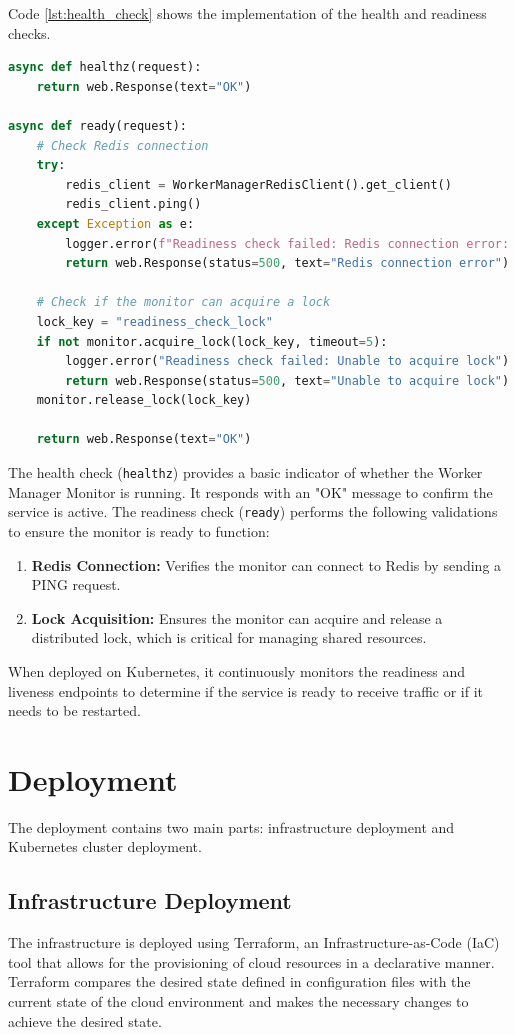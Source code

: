 Code \ref{lst:health_check} shows the implementation of the health and readiness checks.

\begin{lstlisting}[language=python, caption={Worker Manager Monitor Health and Readiness Checks}, label={lst:health_check}]
async def healthz(request):
    return web.Response(text="OK")

async def ready(request):
    # Check Redis connection
    try:
        redis_client = WorkerManagerRedisClient().get_client()
        redis_client.ping()
    except Exception as e:
        logger.error(f"Readiness check failed: Redis connection error: {str(e)}")
        return web.Response(status=500, text="Redis connection error")

    # Check if the monitor can acquire a lock
    lock_key = "readiness_check_lock"
    if not monitor.acquire_lock(lock_key, timeout=5):
        logger.error("Readiness check failed: Unable to acquire lock")
        return web.Response(status=500, text="Unable to acquire lock")
    monitor.release_lock(lock_key)

    return web.Response(text="OK")
\end{lstlisting}

The health check (\texttt{healthz}) provides a basic indicator of whether the Worker Manager Monitor is running. It responds with an "OK" message to confirm the service is active.
The readiness check (\texttt{ready}) performs the following validations to ensure the monitor is ready to function:
\begin{enumerate}
    \item \textbf{Redis Connection:} Verifies the monitor can connect to Redis by sending a PING request.
    \item \textbf{Lock Acquisition:} Ensures the monitor can acquire and release a distributed lock, which is critical for managing shared resources.
\end{enumerate}

When deployed on Kubernetes, it continuously monitors the readiness and liveness endpoints to determine if the service is ready to receive traffic or if it needs to be restarted.

\section{Deployment}
The deployment contains two main parts: infrastructure deployment and Kubernetes cluster deployment.
\subsection{Infrastructure Deployment}
The infrastructure is deployed using Terraform, an Infrastructure-as-Code (IaC) tool that allows for the provisioning of cloud resources in a declarative manner. Terraform compares the desired state defined in configuration files with the current state of the cloud environment and makes the necessary changes to achieve the desired state.

